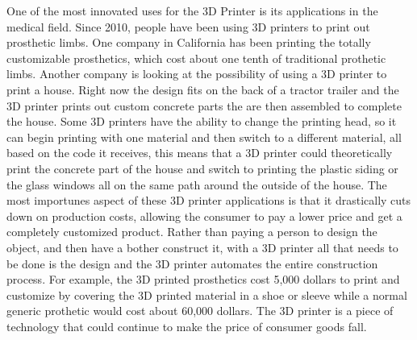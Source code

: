 \documentclass[12pt,twocolumn]{article}
\begin{document}
\begin{description}
\indent	One of the most innovated uses for the 3D Printer is its applications in the medical field. Since 2010, people have been using 3D printers to print out prosthetic limbs. One company in California has been printing the totally customizable prosthetics, which cost about one tenth of traditional prothetic limbs. Another company is looking at the possibility of using a 3D printer to print a house. Right now the design fits on the back of a tractor trailer and the 3D printer prints out custom concrete parts the are then assembled to complete the house. Some 3D printers have the ability to change the printing head, so it can begin printing with one material and then switch to a different material, all based on the code it receives, this means that a 3D printer could theoretically print the concrete part of the house and switch to printing the plastic siding or the glass windows all on the same path around the outside of the house. The most importunes aspect of these 3D printer applications is that it drastically cuts down on production costs, allowing the consumer to pay a lower price and get a completely customized product. Rather than paying a person to design the object, and then have a bother construct it, with a 3D printer all that needs to be done is the design and the 3D printer automates the entire construction process. For example, the 3D printed prosthetics cost 5,000 dollars to print and customize by covering the 3D printed material in a shoe or sleeve while a normal generic prothetic would cost about 60,000 dollars. \cite{cite5} The 3D printer is a piece of technology that could continue to make the price of consumer goods fall.


\end{description}
\end{document}
